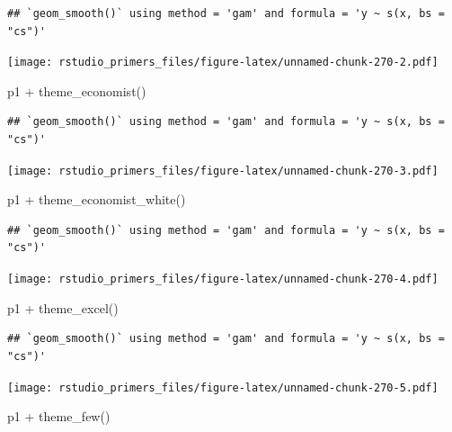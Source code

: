 \documentclass[
]{article}
\newenvironment{Shaded}{\begin{snugshade}}{\end{snugshade}}
\newcommand{\FunctionTok}[1]{\textcolor[rgb]{0.00,0.00,0.00}{#1}}
\newcommand{\NormalTok}[1]{#1}
\newcommand{\SpecialCharTok}[1]{\textcolor[rgb]{0.00,0.00,0.00}{#1}}
\begin{document}
\begin{verbatim}
## `geom_smooth()` using method = 'gam' and formula = 'y ~ s(x, bs = "cs")'
\end{verbatim}

\texttt{[image: rstudio\_primers\_files/figure-latex/unnamed-chunk-270-2.pdf]}

\begin{Shaded}
\begin{Highlighting}[]
\NormalTok{p1 }\SpecialCharTok{+} \FunctionTok{theme\_economist}\NormalTok{()}
\end{Highlighting}
\end{Shaded}

\begin{verbatim}
## `geom_smooth()` using method = 'gam' and formula = 'y ~ s(x, bs = "cs")'
\end{verbatim}

\texttt{[image: rstudio\_primers\_files/figure-latex/unnamed-chunk-270-3.pdf]}

\begin{Shaded}
\begin{Highlighting}[]
\NormalTok{p1 }\SpecialCharTok{+} \FunctionTok{theme\_economist\_white}\NormalTok{()}
\end{Highlighting}
\end{Shaded}

\begin{verbatim}
## `geom_smooth()` using method = 'gam' and formula = 'y ~ s(x, bs = "cs")'
\end{verbatim}

\texttt{[image: rstudio\_primers\_files/figure-latex/unnamed-chunk-270-4.pdf]}

\begin{Shaded}
\begin{Highlighting}[]
\NormalTok{p1 }\SpecialCharTok{+} \FunctionTok{theme\_excel}\NormalTok{()}
\end{Highlighting}
\end{Shaded}

\begin{verbatim}
## `geom_smooth()` using method = 'gam' and formula = 'y ~ s(x, bs = "cs")'
\end{verbatim}

\texttt{[image: rstudio\_primers\_files/figure-latex/unnamed-chunk-270-5.pdf]}

\begin{Shaded}
\begin{Highlighting}[]
\NormalTok{p1 }\SpecialCharTok{+} \FunctionTok{theme\_few}\NormalTok{()}
\end{Highlighting}
\end{Shaded}
\end{document}
